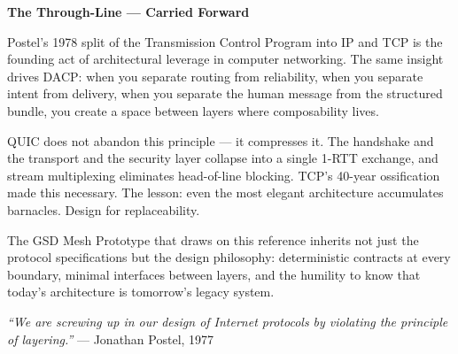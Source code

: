 \documentclass[11pt,letterpaper]{article}
\begin{document}
\begin{quotebox}
\textbf{\sffamily The Through-Line --- Carried Forward}

\medskip

Postel's 1978 split of the Transmission Control Program into IP and TCP is the founding act of architectural leverage in computer networking. The same insight drives DACP: when you separate routing from reliability, when you separate intent from delivery, when you separate the human message from the structured bundle, you create a space between layers where composability lives.

\medskip

QUIC does not abandon this principle --- it compresses it. The handshake and the transport and the security layer collapse into a single 1-RTT exchange, and stream multiplexing eliminates head-of-line blocking. TCP's 40-year ossification made this necessary. The lesson: even the most elegant architecture accumulates barnacles. Design for replaceability.

\medskip

The GSD Mesh Prototype that draws on this reference inherits not just the protocol specifications but the design philosophy: deterministic contracts at every boundary, minimal interfaces between layers, and the humility to know that today's architecture is tomorrow's legacy system.

\medskip

\textit{``We are screwing up in our design of Internet protocols by violating the principle of layering.''} --- Jonathan Postel, 1977
\end{quotebox}
\end{document}
